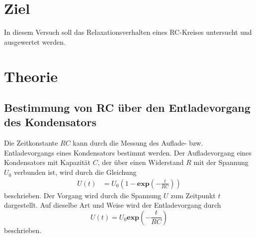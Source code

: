 
\section{Ziel}
In diesem Versuch soll das Relaxationsverhalten eines RC-Kreises untersucht und ausgewertet werden. 

\section{Theorie}
\cite{versuch}
\label{sec:Theorie}
\subsection{Bestimmung von RC über den Entladevorgang des Kondensators}
Die Zeitkonstante $RC$ kann durch die Messung des Auflade- bzw. Entladevorgangs eines Kondensators bestimmt werden.
Der Aufladevorgang eines Kondensators mit Kapazität $C$, der über einen Widerstand $R$ mit der Spannung $U_{0}$ verbunden ist, wird durch die Gleichung
\begin{align*}
     U(t)&= U_{0} (1-\mathbf{exp}(-\frac{t}{RC}))
\end{align*}
beschrieben. Der Vorgang wird durch die Spannung $U$ zum Zeitpunkt $t$ dargestellt. 
Auf dieselbe Art und Weise wird der Entladevorgang durch
\begin{equation*}
     U(t) = U_{0} \mathbf{exp}(-\frac{t}{RC})
\end{equation*}
beschrieben.
